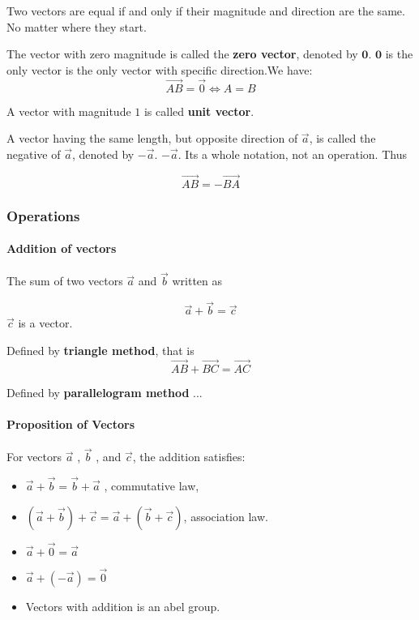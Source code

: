 \documentclass[UTF8]{ctexart}
\begin{document}
Two vectors are equal if and only if their magnitude and direction are the same. No matter where they start.

The vector with zero magnitude is called the \textbf{zero vector}, denoted by $\bm 0$. $\bm 0$ is the only vector is the only vector with specific direction.We have: 
$$
\overrightarrow {AB}=\vec 0 \iff A=B
$$

A vector with magnitude $1$ is called \textbf{ unit vector}.

A vector having the same length, but opposite direction of $\vec a$, is called the negative of $\vec a$, denoted by $-\vec a$. $-\vec a$. Its a whole notation, not an operation. Thus 

$$\overrightarrow  {AB}= - \overrightarrow  {BA}$$

\subsubsection{Operations}

\paragraph{Addition of vectors}

The sum of two vectors $\vec a$ and $\vec{b}$ written as

$$
\vec a +\vec b = \vec c
$$
$\vec c $ is a vector.


Defined by \textbf{triangle method}, that is
$$
\overrightarrow  {AB}+\overrightarrow  {BC}=\overrightarrow  {AC}
$$

Defined by \textbf{parallelogram  method} ...

\paragraph{Proposition of Vectors}

For vectors $\vec a$ , $\vec b$ , and $\vec c$, the addition satisfies:

\begin{itemize}

\item $\vec a+\vec b =\vec b+\vec a $ , commutative law, 

\item $(\vec a+\vec b)+\vec c= \vec a+(\vec b+\vec c) $, association law.

\item $\vec a+\vec 0=\vec a$

\item $\vec a+(-\vec a)=\vec 0$

\item Vectors with addition is an abel group. 

\end{itemize}
\end{document}
